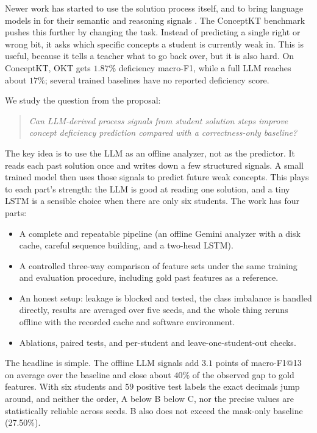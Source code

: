 \documentclass[11pt]{article}
\begin{document}
Newer work has started to use the solution process itself, and to bring language
models in for their semantic and reasoning signals
\cite{lee2024lkt,park2025statuskt,ozyurt2024kcqrl}. The ConceptKT benchmark
\cite{kang2026conceptkt} pushes this further by changing the task. Instead of
predicting a single right or wrong bit, it asks which specific concepts a student is
currently weak in. This is useful, because it tells a teacher what to go back over,
but it is also hard. On ConceptKT, OKT gets $1.87\%$ deficiency macro-F1, while a full LLM reaches about $17\%$; several trained baselines have no reported deficiency score.

We study the question from the proposal:
\begin{quote}\itshape
Can LLM-derived process signals from student solution steps improve concept
deficiency prediction compared with a correctness-only baseline?
\end{quote}

The key idea is to use the LLM as an offline analyzer, not as the predictor. It reads
each past solution once and writes down a few structured signals. A small trained
model then uses those signals to predict future weak concepts. This plays to each
part's strength: the LLM is good at reading one solution, and a tiny LSTM is a
sensible choice when there are only six students. The work has four parts:
\begin{itemize}[leftmargin=1.4em,itemsep=2pt,topsep=2pt]
\item A complete and repeatable pipeline (an offline Gemini analyzer with a disk cache, careful
sequence building, and a two-head LSTM).
\item A controlled three-way comparison of feature sets under the same training and
evaluation procedure, including gold past features as a reference.
\item An honest setup: leakage is blocked and
tested, the class imbalance is handled directly, results are averaged over five seeds,
and the whole thing reruns offline with the recorded cache and software environment.
\item Ablations, paired tests, and per-student and leave-one-student-out checks.
\end{itemize}

The headline is simple. The offline LLM signals add $3.1$ points of macro-F1@13 on average over
the baseline and close about $40\%$ of the observed gap to gold features. With six students and
$59$ positive test labels the exact decimals jump around, and neither
the order, A below B below C, nor the precise values are statistically reliable across seeds. B also does not exceed the mask-only baseline (27.50\%).
\end{document}
